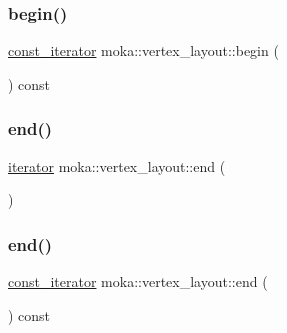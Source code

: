 \subsubsection{\texorpdfstring{begin()}{begin()}\hspace{0.1cm}{\footnotesize\ttfamily [2/2]}}
{\footnotesize\ttfamily \mbox{\hyperlink{classmoka_1_1vertex__layout_ab39e7bec44dbfcac3d5154f8574b198c}{const\+\_\+iterator}} moka\+::vertex\+\_\+layout\+::begin (\begin{DoxyParamCaption}{ }\end{DoxyParamCaption}) const\hspace{0.3cm}{\ttfamily [noexcept]}}

\mbox{\label{classmoka_1_1vertex__layout_ae7a46396dfd0bab6b7fd6e1e68d0b317}} 
\subsubsection{\texorpdfstring{end()}{end()}\hspace{0.1cm}{\footnotesize\ttfamily [1/2]}}
{\footnotesize\ttfamily \mbox{\hyperlink{classmoka_1_1vertex__layout_ae9f116229b2836d428a9d39d41028058}{iterator}} moka\+::vertex\+\_\+layout\+::end (\begin{DoxyParamCaption}{ }\end{DoxyParamCaption})\hspace{0.3cm}{\ttfamily [noexcept]}}

\mbox{\label{classmoka_1_1vertex__layout_a8a353c67a3878e14a76ff7bc985215f4}} 
\subsubsection{\texorpdfstring{end()}{end()}\hspace{0.1cm}{\footnotesize\ttfamily [2/2]}}
{\footnotesize\ttfamily \mbox{\hyperlink{classmoka_1_1vertex__layout_ab39e7bec44dbfcac3d5154f8574b198c}{const\+\_\+iterator}} moka\+::vertex\+\_\+layout\+::end (\begin{DoxyParamCaption}{ }\end{DoxyParamCaption}) const\hspace{0.3cm}{\ttfamily [noexcept]}}

